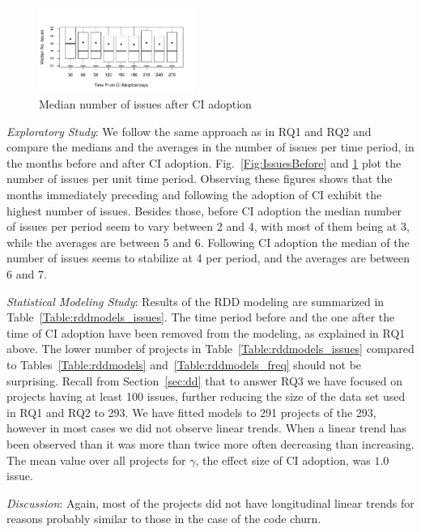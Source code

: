 \begin{figure}[t]
\centering
\includegraphics[width=0.45\textwidth, clip=true, trim=0 15 15 50]{issues_after.pdf}
\caption{Median number of issues after CI adoption}
\label{Fig:IssuesAfter}
\end{figure}

\smallskip\noindent \emph{Exploratory Study}:
We follow the same approach as in RQ1 and RQ2 and compare the 
medians and the averages in the number of issues per time period, in the 
months before and after CI adoption.
Fig.~\ref{Fig:IssuesBefore} and \ref{Fig:IssuesAfter} plot the number of 
issues per unit time period.
Observing these figures shows that the months immediately preceding 
and following the adoption of CI exhibit the highest number of issues.
Besides those, before CI adoption the median number of issues per period seem to vary between 2 and 4, with most of them being at 3, while the averages are between 5 and 6.
Following CI adoption the median of the number of issues seems to 
stabilize at 4 per period, and the averages are between 6 and 7.



\smallskip\noindent \emph{Statistical Modeling Study}:
Results of the RDD modeling are summarized in Table~\ref{Table:rddmodels_issues}.
The time period before and the one after the time of CI adoption have been removed from the modeling, as explained in RQ1 above.
The lower number of projects in Table~\ref{Table:rddmodels_issues} 
compared to Tables~\ref{Table:rddmodels} and~\ref{Table:rddmodels_freq} 
should not be surprising. 
Recall from Section~\ref{sec:dd} that to answer RQ3 we have focused on 
projects having at least 100 issues, further reducing the size of the data set 
used in RQ1 and RQ2 to 293.
We have fitted models to 291 projects of the 293, however in most cases we 
did not observe linear trends.
When a linear trend has been observed than it was more than twice more 
often decreasing than increasing.
The mean value over all projects for $\gamma$, the effect size of CI adoption, 
was $1.0$ issue.


\smallskip\noindent \emph{Discussion}:
Again, most of the projects did not have longitudinal linear trends for reasons probably similar to those in the case of the code churn.

